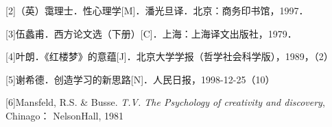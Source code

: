 \documentclass[zihao=-4]{ctexart}
\begin{document}
[2]（英）霭理士．性心理学[M]．潘光旦译．北京：商务印书馆，1997．


[3]伍蠡甫．西方论文选（下册）[C]．上海：上海译文出版社，1979．

[4]叶朗．《红楼梦》的意蕴[J]．北京大学学报（哲学社会科学版），1989，（2）

[5]谢希德．创造学习的新思路[N]．人民日报，1998-12-25（10）

[6]Mansfeld, R.S. \& Busse. \textit{T.V. The Psychology of creativity and discovery}, Chinago：
NelsonHall, 1981




% 
\end{document}
